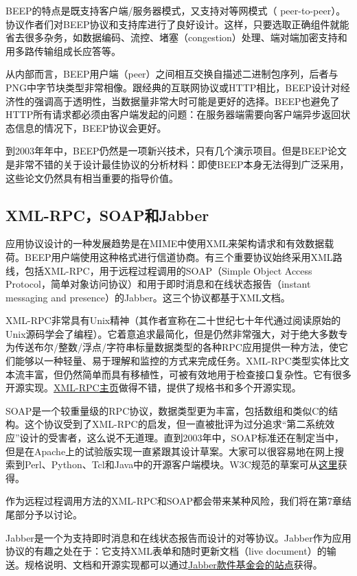 \documentclass[12pt,oneside]{ctexbook}
\begin{document}
\begin{common-format}
BEEP的特点是既支持客户端/服务器模式，又支持对等网模式（ peer-to-peer）。协议作者们对BEEP协议和支持库进行了良好设计。这样，只要选取正确组件就能省去很多杂务，如数据编码、流控、堵塞（congestion）处理、端对端加密支持和用多路传输组成长应答等。

从内部而言，BEEP用户端（peer）之间相互交换自描述二进制包序列，后者与PNG中字节块类型非常相像。跟经典的互联网协议或HTTP相比，BEEP设计对经济性的强调高于透明性，当数据量非常大时可能是更好的选择。BEEP也避免了HTTP所有请求都必须由客户端发起的问题：在服务器端需要向客户端异步返回状态信息的情况下，BEEP协议会更好。

到2003年年中，BEEP仍然是一项新兴技术，只有几个演示项目。但是BEEP论文是非常不错的关于设计最佳协议的分析材料：即使BEEP本身无法得到广泛采用，这些论文仍然具有相当重要的指导价值。

\subsection{XML-RPC，SOAP和Jabber}
应用协议设计的一种发展趋势是在MIME中使用XML来架构请求和有效数据载荷。BEEP用户端使用这种格式进行信道协商。有三个重要协议始终采用XML路线，包括XML-RPC，用于远程过程调用的SOAP（Simple Object Access Protocol，简单对象访问协议）和用于即时消息和在线状态报告（instant messaging and presence）的Jabber。这三个协议都基于XML文档。

XML-RPC非常具有Unix精神（其作者宣称在二十世纪七十年代通过阅读原始的Unix源码学会了编程）。它着意追求最简化，但是仍然非常强大，对于绝大多数专为传送布尔/整数/浮点/字符串标量数据类型的各种RPC应用提供一种方法，使它们能够以一种轻量、易于理解和监控的方式来完成任务。XML-RPC类型实体比文本流丰富，但仍然简单而具有移植性，可被有效地用于检查接口复杂性。它有很多开源实现。\href{http://www.xmlrpc.com/}{XML-RPC主页}做得不错，提供了规格书和多个开源实现。

SOAP是一个较重量级的RPC协议，数据类型更为丰富，包括数组和类似C的结构。这个协议受到了XML-RPC的启发，但一直被批评为过分追求“第二系统效应”设计的受害者，这么说不无道理。直到2003年中，SOAP标准还在制定当中，但是在Apache上的试验版实现一直紧跟其设计草案。大家可以很容易地在网上搜索到Perl、Python、Tcl和Java中的开源客户端模块。W3C规范的草案可从\href{http://www.w3.org/TR/SOAP/}{这里}获得。

作为远程过程调用方法的XML-RPC和SOAP都会带来某种风险，我们将在第7章结尾部分予以讨论。

Jabber是一个为支持即时消息和在线状态报告而设计的对等协议。Jabber作为应用协议的有趣之处在于：它支持XML表单和随时更新文档（live document）的输送。规格说明、文档和开源实现都可以通过\href{http://www.jabber.org/about/overview.html}{Jabber款件基金会的站点}获得。



\end{common-format}
\end{document}
